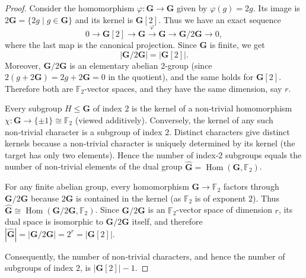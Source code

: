 \documentclass[10pt,a4paper]{amsart}
\begin{document}
\begin{proof}
    Consider the homomorphism $\varphi: \mathbf{G} \to \mathbf{G}$ given by $\varphi(g) = 2g$. Its image is $2\mathbf{G} = \{2g \mid g \in \mathbf{G}\}$ and its kernel is $\mathbf{G}[2]$. Thus we have an exact sequence
    \[
    0 \longrightarrow \mathbf{G}[2] \longrightarrow \mathbf{G} \stackrel{\varphi}{\longrightarrow} \mathbf{G} \longrightarrow \mathbf{G}/2\mathbf{G} \longrightarrow 0,
    \]
    where the last map is the canonical projection. Since $\mathbf{G}$ is finite, we get
    \[
    |\mathbf{G}/2\mathbf{G}| = |\mathbf{G}[2]|.
    \]
    Moreover, $\mathbf{G}/2\mathbf{G}$ is an elementary abelian $2$-group (since $2(g+2\mathbf{G})=2g+2\mathbf{G}=0$ in the quotient), and the same holds for $\mathbf{G}[2]$. Therefore both are $\mathbb{F}_2$-vector spaces, and they have the same dimension, say $r$.

    Every subgroup $H \le \mathbf{G}$ of index $2$ is the kernel of a non‑trivial homomorphism $\chi: \mathbf{G} \to \{\pm 1\} \cong \mathbb{F}_2$ (viewed additively). Conversely, the kernel of any such non‑trivial character is a subgroup of index $2$. Distinct characters give distinct kernels because a non‑trivial character is uniquely determined by its kernel (the target has only two elements). Hence the number of index‑$2$ subgroups equals the number of non‑trivial elements of the dual group $\widehat{\mathbf{G}} = \operatorname{Hom}(\mathbf{G}, \mathbb{F}_2)$.

    For any finite abelian group, every homomorphism $\mathbf{G} \to \mathbb{F}_2$ factors through $\mathbf{G}/2\mathbf{G}$ because $2\mathbf{G}$ is contained in the kernel (as $\mathbb{F}_2$ is of exponent $2$). Thus $\widehat{\mathbf{G}} \cong \operatorname{Hom}(\mathbf{G}/2\mathbf{G}, \mathbb{F}_2)$. Since $\mathbf{G}/2\mathbf{G}$ is an $\mathbb{F}_2$-vector space of dimension $r$, its dual space is isomorphic to $\mathbf{G}/2\mathbf{G}$ itself, and therefore $|\widehat{\mathbf{G}}| = |\mathbf{G}/2\mathbf{G}| = 2^r = |\mathbf{G}[2]|$.

    Consequently, the number of non‑trivial characters, and hence the number of subgroups of index $2$, is $|\mathbf{G}[2]| - 1$.
\end{proof}
\end{document}
